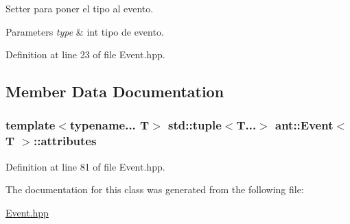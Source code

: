 Setter para poner el tipo al evento. 


\begin{DoxyParams}{Parameters}
{\em type} & int tipo de evento. \\
\hline
\end{DoxyParams}


Definition at line 23 of file Event.\+hpp.



\subsection{Member Data Documentation}
\hypertarget{classant_1_1_event_af66dcaa27ed84fbcaa880d80ec206a15}{
\subsubsection[{attributes}]{\setlength{\rightskip}{0pt plus 5cm}template$<$typename... T$>$ std\+::tuple$<$T...$>$ {\bf ant\+::\+Event}$<$ T $>$\+::attributes\hspace{0.3cm}{\ttfamily [private]}}}\label{classant_1_1_event_af66dcaa27ed84fbcaa880d80ec206a15}


Definition at line 81 of file Event.\+hpp.



The documentation for this class was generated from the following file\+:\begin{DoxyCompactItemize}
\item 
\hyperlink{_event_8hpp}{Event.\+hpp}\end{DoxyCompactItemize}
